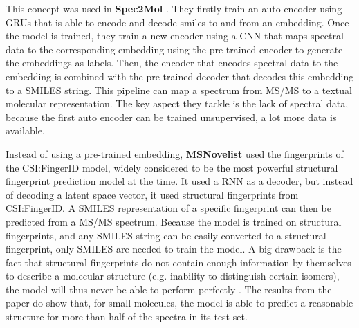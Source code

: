 This concept was used in \textbf{Spec2Mol} \cite{litsa2021spec2mol}. They firstly train an auto encoder using \acp{GRU} that is able to encode and decode smiles to and from an embedding. Once the model is trained, they train a new encoder using a \ac{CNN} that maps spectral data to the corresponding embedding using the pre-trained encoder to generate the embeddings as labels. Then, the encoder that encodes spectral data to the embedding is combined with the pre-trained decoder that decodes this embedding to a SMILES string.
This pipeline can map a spectrum from \ac{MS/MS} to a textual molecular representation. The key aspect they tackle is the lack of spectral data, because the first auto encoder can be trained unsupervised, a lot more data is available.

Instead of using a pre-trained embedding, \textbf{MSNovelist} \cite{stravs2022msnovelist} used the fingerprints of the CSI:FingerID model, widely considered to be the most powerful structural fingerprint prediction model at the time. It used a \ac{RNN} as a decoder, but instead of decoding a latent space vector, it used structural fingerprints from CSI:FingerID. A SMILES representation of a specific fingerprint can then be predicted from a \ac{MS/MS} spectrum. Because the model is trained on structural fingerprints, and any SMILES string can be easily converted to a structural fingerprint, only SMILES are needed to train the model. A big drawback is the fact that structural fingerprints do not contain enough information by themselves to describe a molecular structure (e.g. inability to distinguish certain isomers), the model will thus never be able to perform perfectly \cite{kretschmer2023small}.
The results from the paper do show that, for small molecules, the model is able to predict a reasonable structure for more than half of the spectra in its test set.

